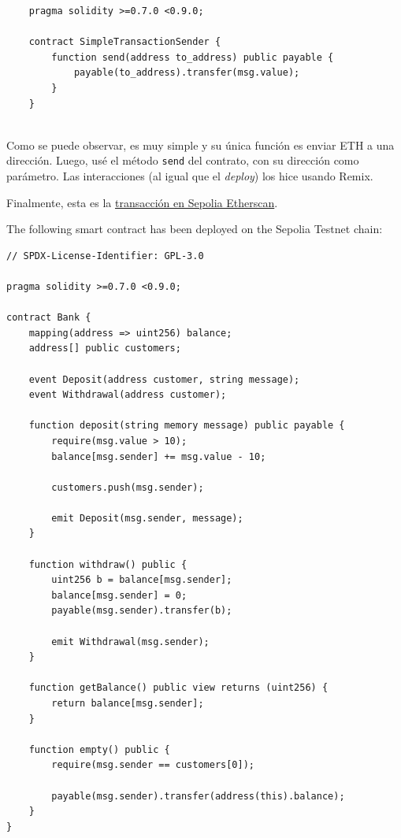 \documentclass[12pt,addpoints,answers]{exam}
\begin{document}
\begin{questions}
\begin{solution}
\begin{verbatim}
    pragma solidity >=0.7.0 <0.9.0;

    contract SimpleTransactionSender {
        function send(address to_address) public payable {
            payable(to_address).transfer(msg.value);
        }
    }
   
   \end{verbatim}
   Como se puede observar, es muy simple y su única función es enviar ETH a una dirección.
   Luego, usé el método \texttt{send} del contrato, con su dirección como parámetro.
   Las interacciones (al igual que el \textit{deploy}) los hice usando Remix.
   
   Finalmente, esta es la \href{https://sepolia.etherscan.io/tx/0x8151a4313435dabb1ebbf7a7f4bbb55fa69841f1d640f90ed8945c8f3d5ed42f}{transacción en Sepolia Etherscan}.

\end{solution}

\newpage
  
\question The following smart contract has been deployed on the Sepolia Testnet chain:

{\footnotesize

\begin{verbatim}
// SPDX-License-Identifier: GPL-3.0

pragma solidity >=0.7.0 <0.9.0;

contract Bank {
    mapping(address => uint256) balance;
    address[] public customers;

    event Deposit(address customer, string message);
    event Withdrawal(address customer);

    function deposit(string memory message) public payable {
        require(msg.value > 10);
        balance[msg.sender] += msg.value - 10;

        customers.push(msg.sender);

        emit Deposit(msg.sender, message);
    }

    function withdraw() public {
        uint256 b = balance[msg.sender];
        balance[msg.sender] = 0;
        payable(msg.sender).transfer(b);

        emit Withdrawal(msg.sender);
    }

    function getBalance() public view returns (uint256) {
        return balance[msg.sender];
    }
    
    function empty() public {
        require(msg.sender == customers[0]);
        
        payable(msg.sender).transfer(address(this).balance);
    }
}
\end{verbatim}

}
\end{questions}
\end{document}
